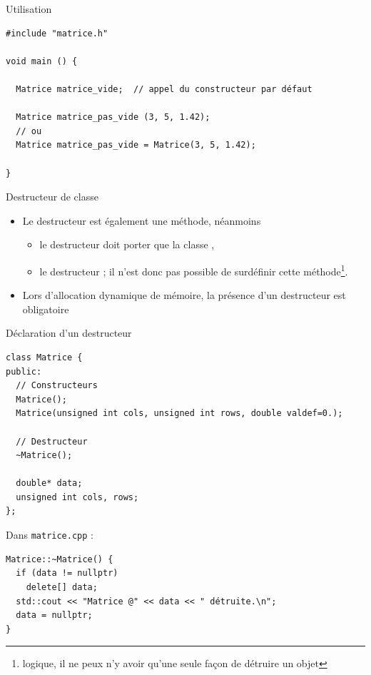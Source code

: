 \documentclass[c]{beamer}
\begin{document}

\begin{frame}[fragile]{Utilisation}
\begin{verbatim}
#include "matrice.h"

void main () {

  Matrice matrice_vide;  // appel du constructeur par défaut

  Matrice matrice_pas_vide (3, 5, 1.42);
  // ou
  Matrice matrice_pas_vide = Matrice(3, 5, 1.42);

}
\end{verbatim}
\end{frame}


\begin{frame}[fragile]{Destructeur de classe}
\begin{itemize}
\item Le destructeur est également une méthode, néanmoins

\begin{itemize}
\item le destructeur doit porter  que la classe ,

\item le destructeur ; il n'est donc pas possible de surdéfinir cette méthode\footnote{logique, il ne peux n'y avoir qu'une seule façon de détruire un objet}.
\end{itemize}

\item Lors d'allocation dynamique de mémoire, la présence d'un destructeur est obligatoire
\end{itemize}
\end{frame}


\begin{frame}[fragile]{Déclaration d'un destructeur}
\begin{verbatim}
class Matrice {
public:
  // Constructeurs
  Matrice();
  Matrice(unsigned int cols, unsigned int rows, double valdef=0.);

  // Destructeur
  ~Matrice();

  double* data;
  unsigned int cols, rows;
};
\end{verbatim}

Dans \texttt{matrice.cpp} :

\begin{verbatim}
Matrice::~Matrice() {
  if (data != nullptr)
    delete[] data;
  std::cout << "Matrice @" << data << " détruite.\n";
  data = nullptr;
}
\end{verbatim}

\end{frame}
\end{document}
